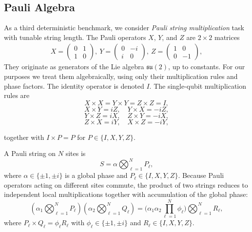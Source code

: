 \documentclass{article}
\theoremstyle{plain}
\begin{document}
\subsection{Pauli Algebra}

As a third deterministic benchmark, we consider \emph{Pauli string multiplication} task with tunable string length. The Pauli operators $X$, $Y$, and $Z$ are $2\times 2$ matrices
\begin{align}
    X=\left(\begin{array}{cc}0&1\\1&0\end{array}\right),~Y=\left(\begin{array}{cc}0&-i\\i&0\end{array}\right),~Z=\left(\begin{array}{cc}1&0\\0&-1\end{array}\right),
\end{align}
They originate as generators of the Lie algebra $\mathfrak{su}(2)$, up to constants. For our purposes we treat them algebraically, using only their multiplication rules and phase factors. The identity operator is denoted $I$. The single-qubit multiplication rules are
\begin{equation}
X \times X = Y \times Y = Z \times Z = I,
\end{equation}
\begin{equation}
X \times Y = iZ, \quad Y \times X = -iZ,
\end{equation}
\begin{equation}
Y \times Z = iX, \quad Z \times Y = -iX,
\end{equation}
\begin{equation}
Z \times X = iY, \quad X \times Z = -iY,
\end{equation}

together with $I \times P = P$ for $P \in \{I,X,Y,Z\}$.

A Pauli string on $N$ sites is
\begin{equation}
S = \alpha \bigotimes_{\ell=1}^{N} P_\ell,
\end{equation}
where $\alpha \in \{\pm 1,\pm i\}$ is a global phase and $P_\ell \in \{I,X,Y,Z\}$.
Because Pauli operators acting on different sites commute, the product of two strings reduces to independent local multiplications together with accumulation of the global phase:
\begin{equation}
\left(\alpha_1 \bigotimes_{\ell=1}^{N} P_\ell \right)
\left(\alpha_2 \bigotimes_{\ell=1}^{N} Q_\ell \right)
= \Big(\alpha_1 \alpha_2 \prod_{\ell=1}^{N} \phi_\ell \Big)
\bigotimes_{\ell=1}^{N} R_\ell,
\end{equation}
where $P_\ell \times Q_\ell = \phi_\ell R_\ell$ with $\phi_\ell \in \{\pm 1,\pm i\}$ and $R_\ell \in \{I,X,Y,Z\}$.
\end{document}
